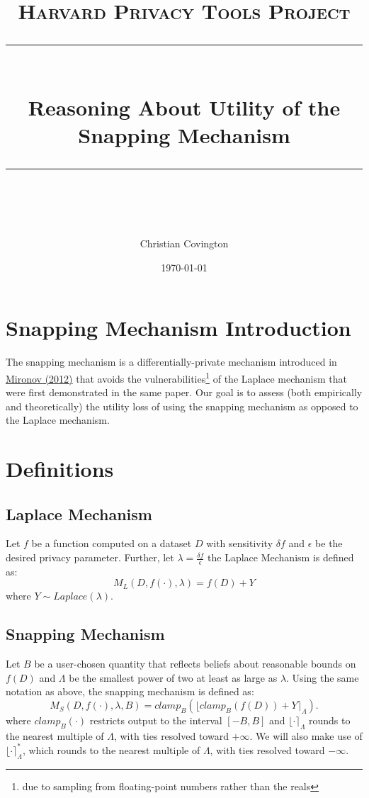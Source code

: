 \documentclass[11pt]{scrartcl} %
\title{
	\normalfont\normalsize
	\textsc{Harvard Privacy Tools Project}\\ %
	\vspace{25pt} %
	\rule{\linewidth}{0.5pt}\\ %
	\vspace{20pt} %
	{\huge Reasoning About Utility of the Snapping Mechanism}\\ %
	\vspace{12pt} %
	\rule{\linewidth}{2pt}\\ %
	\vspace{12pt} %
}
\author{\LARGE Christian Covington} %
\date{\normalsize\today} %
\begin{document}
\maketitle %

\section{Snapping Mechanism Introduction}
The snapping mechanism is a differentially-private mechanism introduced in \href{http://citeseerx.ist.psu.edu/viewdoc/download?doi=10.1.1.366.5957&rep=rep1&type=pdf}{Mironov (2012)} that avoids the vulnerabilities\footnote{due to sampling from floating-point numbers rather than the reals} of the Laplace mechanism that were first demonstrated in the same paper. Our goal is to assess (both empirically and theoretically) the utility loss of using the snapping mechanism as opposed to the Laplace mechanism. \newline

\section{Definitions}
\subsection{Laplace Mechanism}
Let $f$ be a function computed on a dataset $D$ with sensitivity $\delta f$ and $\epsilon$ be the desired privacy parameter. Further, let $\lambda = \frac{\delta f}{\epsilon}$ the Laplace Mechanism is defined as:
\[ M_{L}(D, f(\cdot), \lambda) = f(D) + Y \]
where $Y \sim Laplace(\lambda)$.

\subsection{Snapping Mechanism}
Let $B$ be a user-chosen quantity that reflects beliefs about reasonable bounds on $f(D)$ and $\Lambda$ be the smallest power of two at least as large as $\lambda$. Using the same notation as above, the snapping mechanism is defined as:
\[ M_{S}(D, f(\cdot), \lambda, B) = clamp_{B}\left( \lfloor clamp_{B}\left( f(D) \right) + Y \rceil_{\Lambda} \right). \]
where $clamp_{B}(\cdot)$ restricts output to the interval $[-B, B]$ and $\lfloor \cdot \rceil_{\Lambda}$ rounds to the nearest multiple of $\Lambda$, with ties resolved toward $+ \infty$. We will also make use of $\lfloor \cdot \rceil^{*}_{\Lambda}$, which rounds to the nearest multiple of $\Lambda$, with ties resolved toward $- \infty$. \newline
\end{document}
